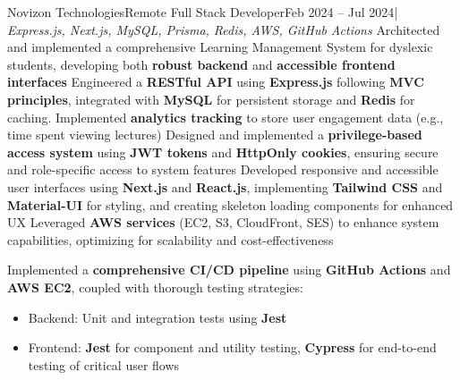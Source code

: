 \resumeSubheading
  {Novizon Technologies}{Remote}
  {Full Stack Developer}{Feb 2024 -- Jul 2024}{| \textit{Express.js, Next.js, MySQL, Prisma, Redis, AWS, GitHub Actions}}
  \resumeItemListStart
    {Architected and implemented a comprehensive Learning Management System for dyslexic students, developing both \textbf{robust backend} and \textbf{accessible frontend interfaces}}
    {Engineered a \textbf{RESTful API} using \textbf{Express.js} following \textbf{MVC principles}, integrated with \textbf{MySQL} for persistent storage and \textbf{Redis} for caching. Implemented \textbf{analytics tracking} to store user engagement data (e.g., time spent viewing lectures)}
    {Designed and implemented a \textbf{privilege-based access system} using \textbf{JWT tokens} and \textbf{HttpOnly cookies}, ensuring secure and role-specific access to system features}
    {Developed responsive and accessible user interfaces using \textbf{Next.js} and \textbf{React.js}, implementing \textbf{Tailwind CSS} and \textbf{Material-UI} for styling, and creating skeleton loading components for enhanced UX}
    {Leveraged \textbf{AWS services} (EC2, S3, CloudFront, SES) to enhance system capabilities, optimizing for scalability and cost-effectiveness}
    {Implemented a \textbf{comprehensive CI/CD pipeline} using \textbf{GitHub Actions} and \textbf{AWS EC2}, coupled with thorough testing strategies:
    \begin{itemize}
      \item Backend: Unit and integration tests using \textbf{Jest}
      \item Frontend: \textbf{Jest} for component and utility testing, \textbf{Cypress} for end-to-end testing of critical user flows
    \end{itemize}}
  \resumeItemListEnd 